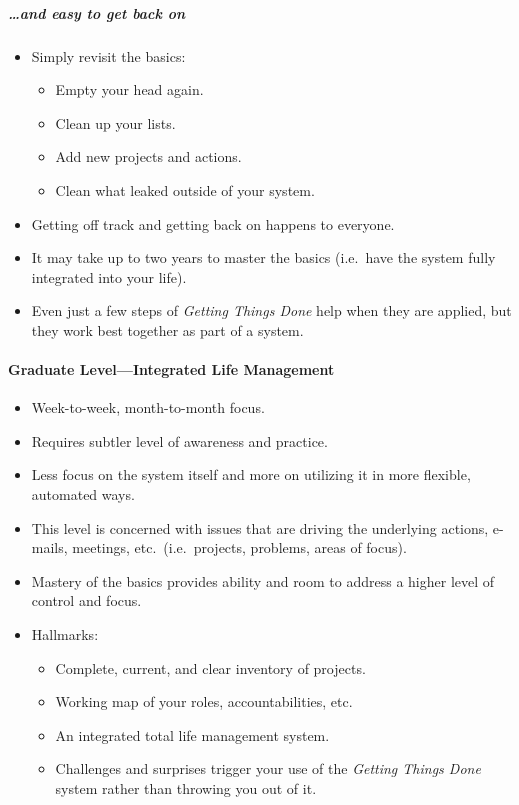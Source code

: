 \documentclass{article}
\begin{document}
\subparagraph{\ldots and easy to get back on}

\begin{itemize}
 \item Simply revisit the basics:
 \begin{itemize}
  \item Empty your head again.
  \item Clean up your lists.
  \item Add new projects and actions.
  \item Clean what leaked outside of your system.
 \end{itemize}
 \item Getting off track and getting back on happens to everyone.
 \item It may take up to two years to master the basics (i.e.\ have the system fully integrated into your life).
 \item Even just a few steps of \textit{Getting Things Done} help when they are applied, but they work best together as part of a system.
\end{itemize}

\paragraph{Graduate Level---Integrated Life Management}

\begin{itemize}
 \item Week-to-week, month-to-month focus.
 \item Requires subtler level of awareness and practice.
 \item Less focus on the system itself and more on utilizing it in more flexible, automated ways.
 \item This level is concerned with issues that are driving the underlying actions, e-mails, meetings, etc.\ (i.e.\ projects, problems, areas of focus).
 \item Mastery of the basics provides ability and room to address a higher level of control and focus.
 \item Hallmarks:
 \begin{itemize}
  \item Complete, current, and clear inventory of projects.
  \item Working map of your roles, accountabilities, etc.
  \item An integrated total life management system.
  \item Challenges and surprises trigger your use of the \textit{Getting Things Done} system rather than throwing you out of it.
 \end{itemize}
\end{itemize}
\end{document}
